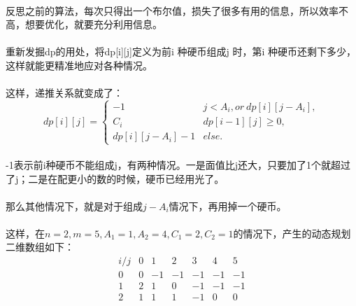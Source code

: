 \documentclass[UTF-8, 12pt]{ctexart}
\begin{document}
    \paragraph{}
    反思之前的算法，每次只得出一个布尔值，损失了很多有用的信息，所以效率不高，想要优化，就要充分利用信息。

    \paragraph{}
    重新发掘dp的用处，将dp[i][j]定义为前i 种硬币组成j 时，第i 种硬币还剩下多少，这样就能更精准地应对各种情况。

    \paragraph{}
    这样，递推关系就变成了：
    \[dp[i][j]=\left\{\begin{array}{lll}
        -1              & j<A_i, or \ dp[i][j-A_i],\\
        C_i             & dp[i-1][j] \ge 0, \\
        dp[i][j-A_i] - 1& else.
    \end{array}\right.\]
    
    \paragraph{}
    -1表示前i种硬币不能组成j，有两种情况。一是面值比j还大，只要加了1个就超过了j；二是在配更小的数的时候，硬币已经用光了。

    \paragraph{}
    那么其他情况下，就是对于组成$j-A_i$情况下，再用掉一个硬币。

    \paragraph{}
    这样，在$n = 2, m = 5, A_1 = 1, A_2 = 4, C_1 = 2, C_2 = 1$的情况下，产生的动态规划二维数组如下：
    \begin{equation}
        \begin{array}{ccccccc}
            i/j & 0 & 1 & 2 & 3 & 4 & 5 \\
            0   & 0 & -1 & -1 & -1 & -1 & -1 \\
            1   & 2 & 1 & 0 & -1 & -1 & -1 \\
            2   & 1 & 1 & 1 & -1 & 0 & 0 
        \end{array}
    \end{equation}
\end{document}
